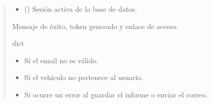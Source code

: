 \documentclass[letterpaper,10pt,spanish]{sphinxmanual}
\begin{document}
\begin{fulllineitems}
\begin{quote}
\begin{description}
\begin{itemize}
\item {} 
\sphinxAtStartPar
{} () \textendash{} Sesión activa de la base de datos.

\end{itemize}

\sphinxAtStartPar
Mensaje de éxito, token generado y enlace de acceso.

\sphinxAtStartPar
dict

\begin{itemize}
\item {} 
\sphinxAtStartPar
{} \textendash{} Si el email no es válido.

\item {} 
\sphinxAtStartPar
{} \textendash{} Si el vehículo no pertenece al usuario.

\item {} 
\sphinxAtStartPar
{} \textendash{} Si ocurre un error al guardar el informe o enviar el correo.

\end{itemize}

\end{description}\end{quote}

\end{fulllineitems}

\end{document}
